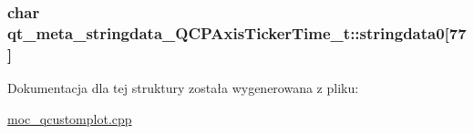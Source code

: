 \subsubsection[{\texorpdfstring{stringdata0}{stringdata0}}]{\setlength{\rightskip}{0pt plus 5cm}char qt\+\_\+meta\+\_\+stringdata\+\_\+\+Q\+C\+P\+Axis\+Ticker\+Time\+\_\+t\+::stringdata0\mbox{[}77\mbox{]}}\hypertarget{structqt__meta__stringdata___q_c_p_axis_ticker_time__t_aad085a5c9bf7f31e1826758e85aebe4e}{}\label{structqt__meta__stringdata___q_c_p_axis_ticker_time__t_aad085a5c9bf7f31e1826758e85aebe4e}


Dokumentacja dla tej struktury została wygenerowana z pliku\+:\begin{DoxyCompactItemize}
\item 
\hyperlink{moc__qcustomplot_8cpp}{moc\+\_\+qcustomplot.\+cpp}\end{DoxyCompactItemize}
